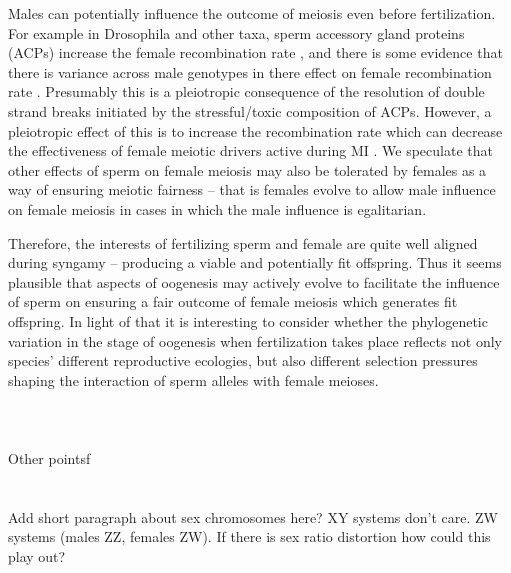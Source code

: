 \documentclass[12pt,letterpaper]{article}
\newcommand{\gc}[1]{{ \color{red} #1}}
\begin{document}
Males can potentially influence the outcome of meiosis even before fertilization. 
For example in Drosophila and other taxa, sperm accessory
        gland proteins (ACPs) increase the female recombination rate
        \cite{SOMEthING}, and there is some evidence that there is
        variance across male genotypes in there effect on female
        recombination rate \cite{Stevison2012}.
Presumably this is a pleiotropic consequence of the resolution of double strand breaks initiated by the stressful/toxic composition of ACPs. 
However, a pleiotropic effect of this is to increase the recombination rate which can decrease the effectiveness of female meiotic drivers
active during MI \citep{Brandvain}. 
We speculate that other effects of sperm on female meiosis may also be tolerated by females as a way of ensuring meiotic fairness -- 
	that is females evolve to allow male influence on female meiosis in cases in which the male influence is  egalitarian. 



  
Therefore, the interests of fertilizing sperm and female are quite well aligned during syngamy -- producing a viable and potentially fit offspring. 
Thus it seems plausible that aspects of oogenesis may actively evolve to facilitate the influence of sperm on ensuring a fair  outcome of female meiosis which generates fit offspring.
In light of that it is interesting to consider whether the phylogenetic variation in the stage of oogenesis when fertilization takes place reflects not
	only species' different reproductive ecologies, but also different selection pressures shaping the interaction of sperm alleles with female meioses. 
\\
\\
\\
\\
\gc{Other pointsf}\\
\\
\\
\gc{Add short paragraph about sex chromosomes here? XY systems don't care. ZW systems (males ZZ, females ZW). If there is
sex ratio distortion how could this play out?}
\end{document}

